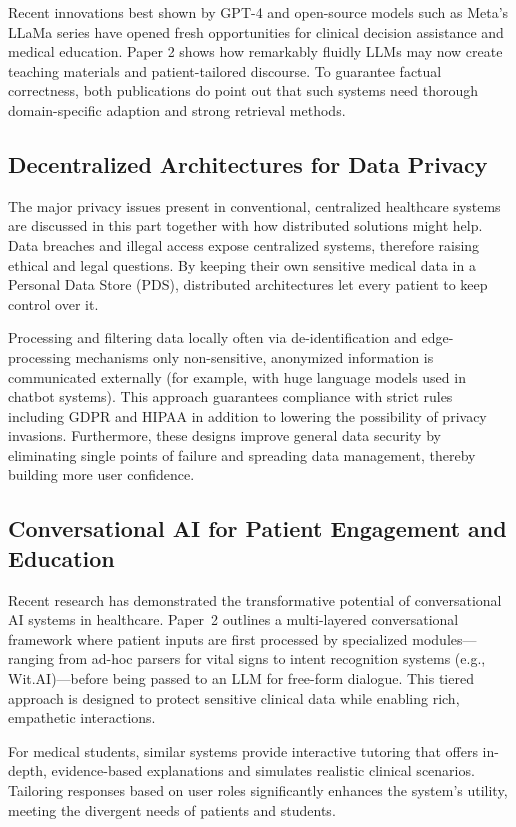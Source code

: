 Recent innovations best shown by GPT-4 and open-source models such as Meta's LLaMa series have opened fresh opportunities for clinical decision assistance and medical education. Paper 2 shows how remarkably fluidly LLMs may now create teaching materials and patient-tailored discourse. To guarantee factual correctness, both publications do point out that such systems need thorough domain-specific adaption and strong retrieval methods.

\subsection{Decentralized Architectures for Data Privacy}
The major privacy issues present in conventional, centralized healthcare systems are discussed in this part together with how distributed solutions might help. Data breaches and illegal access expose centralized systems, therefore raising ethical and legal questions. By keeping their own sensitive medical data in a Personal Data Store (PDS), distributed architectures let every patient to keep control over it.

Processing and filtering data locally often via de-identification and edge-processing mechanisms only non-sensitive, anonymized information is communicated externally (for example, with huge language models used in chatbot systems). This approach guarantees compliance with strict rules including GDPR and HIPAA in addition to lowering the possibility of privacy invasions. Furthermore, these designs improve general data security by eliminating single points of failure and spreading data management, thereby building more user confidence.

\subsection{Conversational AI for Patient Engagement and Education}
Recent research has demonstrated the transformative potential of conversational AI systems in healthcare. Paper~2 outlines a multi-layered conversational framework where patient inputs are first processed by specialized modules—ranging from ad-hoc parsers for vital signs to intent recognition systems (e.g., Wit.AI)—before being passed to an LLM for free-form dialogue. This tiered approach is designed to protect sensitive clinical data while enabling rich, empathetic interactions.

For medical students, similar systems provide interactive tutoring that offers in-depth, evidence-based explanations and simulates realistic clinical scenarios. Tailoring responses based on user roles significantly enhances the system’s utility, meeting the divergent needs of patients and students.

